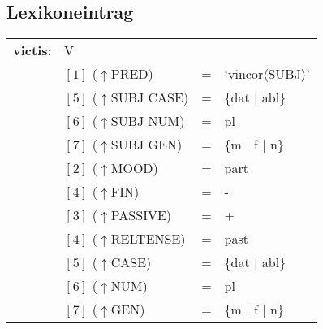 \documentclass[12pt,a4paper]{article}
\begin{document}

\subsection{Lexikoneintrag}
\begin{singlespace}
\begin{tabular}{ l  l  l  l  } 
\textbf{victis}: & V \\
$\qquad$ & $[1]$ \:  ($\uparrow$PRED) & = & `vincor$\langle$SUBJ$\rangle$'\\
$\qquad$ & $[5]$ \: ($\uparrow$SUBJ CASE) & = & \{dat $\mid$ abl\} \\
$\qquad$ & $[6]$ \:  ($\uparrow$SUBJ NUM) & = & pl \\
$\qquad$ & $[7]$ \: ($\uparrow$SUBJ GEN) & = & \{m $\mid$ f $\mid$ n\} \\
$\qquad$ & $[2]$ \:  ($\uparrow$MOOD) & = & part\\
$\qquad$ & $[4]$ \:  ($\uparrow$FIN) & = & - \\
$\qquad$ & $[3]$ \: ($\uparrow$PASSIVE) & = & + \\
$\qquad$ & $[4]$ \: ($\uparrow$RELTENSE) & = & past \\
$\qquad$ & $[5]$ \: ($\uparrow$CASE) & = & \{dat $\mid$ abl\} \\
$\qquad$ & $[6]$ \:  ($\uparrow$NUM) & = & pl \\
$\qquad$ & $[7]$ \: ($\uparrow$GEN) & = & \{m $\mid$ f $\mid$ n\} \\
\end{tabular}
\end{singlespace}
\end{document}
